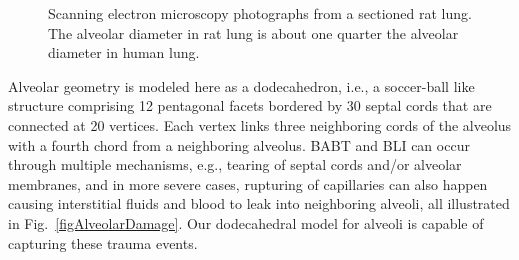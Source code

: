 \begin{figure}
    \centering
    \hfill
    \caption{Scanning electron microscopy photographs from a sectioned rat lung.  The alveolar diameter in rat lung is about one quarter the alveolar diameter in human lung.}
    \label{figRatLung}
\end{figure}

Alveolar geometry is modeled here as a dodecahedron, i.e., a soccer-ball like structure comprising 12 pentagonal facets bordered by 30 septal cords that are connected at 20 vertices.  Each vertex links three neighboring cords of the alveolus with a fourth chord from a neighboring alveolus.  BABT and BLI can occur through multiple mechanisms, e.g., tearing of septal cords and\slash or alveolar membranes, and in more severe cases, rupturing of capillaries can also happen causing interstitial fluids and blood to leak into neighboring alveoli, all illustrated in Fig.~\ref{figAlveolarDamage}.  Our dodecahedral model for alveoli is capable of capturing these trauma events.

